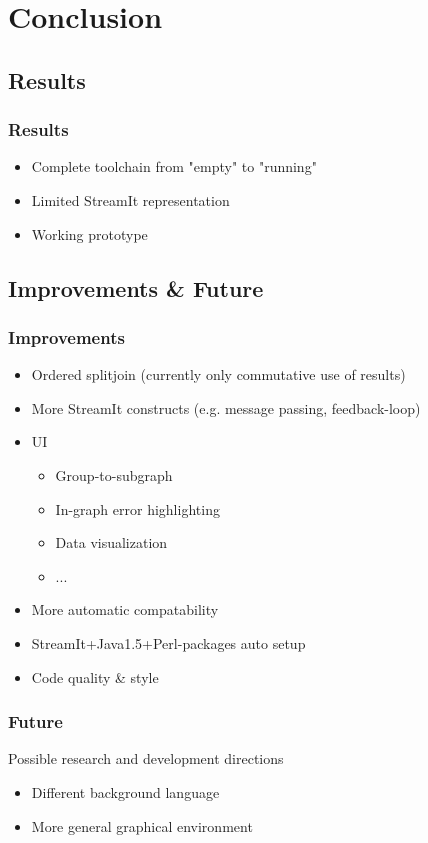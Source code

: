 \documentclass{beamer}
\begin{document}
\section{Conclusion}

\subsection{Results}
\begin{frame}
\frametitle{Results}
	\begin{itemize}
		\item Complete toolchain from "empty" to "running"
		\item Limited StreamIt representation
		\item Working prototype
	\end{itemize}
\end{frame}

\subsection{Improvements \& Future}
\begin{frame}
\frametitle{Improvements}
	\begin{itemize}
		\item Ordered splitjoin (currently only commutative use of results)
		\item More StreamIt constructs (e.g. message passing, feedback-loop)
		\item UI
		\begin{itemize}
			\item Group-to-subgraph
			\item In-graph error highlighting
			\item Data visualization
			\item ...
		\end{itemize}
		\item More automatic compatability
		\item StreamIt+Java1.5+Perl-packages auto setup
		\item Code quality \& style
	\end{itemize}
\end{frame}

\begin{frame}
\frametitle{Future}
Possible research and development directions
	\begin{itemize}
		\item Different background language
		\item More general graphical environment
	\end{itemize}
\end{frame}
\end{document}
